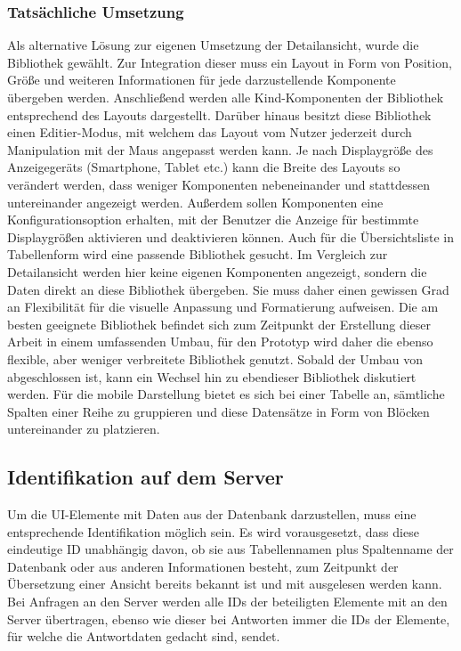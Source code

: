 \subsubsection{Tatsächliche Umsetzung}\label{subsec:layout}
Als alternative Lösung zur eigenen Umsetzung der Detailansicht, wurde die Bibliothek  gewählt. Zur Integration dieser muss ein Layout in Form von Position, Größe und weiteren Informationen für jede darzustellende Komponente übergeben werden. Anschließend werden alle Kind-Komponenten der Bibliothek entsprechend des Layouts dargestellt. Darüber hinaus besitzt diese Bibliothek einen Editier-Modus, mit welchem das Layout vom Nutzer jederzeit durch Manipulation mit der Maus angepasst werden kann. Je nach Displaygröße des Anzeigegeräts (Smartphone, Tablet etc.) kann die Breite des Layouts so verändert werden, dass weniger Komponenten nebeneinander und stattdessen untereinander angezeigt werden. Außerdem sollen Komponenten eine Konfigurationsoption erhalten, mit der Benutzer die Anzeige für bestimmte Displaygrößen aktivieren und deaktivieren können.
Auch für die Übersichtsliste in Tabellenform wird eine passende Bibliothek gesucht. Im Vergleich zur Detailansicht werden hier keine eigenen Komponenten angezeigt, sondern die Daten direkt an diese Bibliothek übergeben. Sie muss daher einen gewissen Grad an Flexibilität für die visuelle Anpassung und Formatierung aufweisen. Die am besten geeignete Bibliothek  befindet sich zum Zeitpunkt der Erstellung dieser Arbeit in einem umfassenden Umbau, für den Prototyp wird daher die ebenso flexible, aber weniger verbreitete Bibliothek  genutzt. Sobald der Umbau von  abgeschlossen ist, kann ein Wechsel hin zu ebendieser Bibliothek diskutiert werden. Für die mobile Darstellung bietet es sich bei einer Tabelle an, sämtliche Spalten einer Reihe zu gruppieren und diese Datensätze in Form von Blöcken untereinander zu platzieren.

\subsection{Identifikation auf dem Server}
Um die UI-Elemente mit Daten aus der Datenbank darzustellen, muss eine entsprechende Identifikation möglich sein. Es wird vorausgesetzt, dass diese eindeutige ID unabhängig davon, ob sie aus Tabellennamen plus Spaltenname der Datenbank oder aus anderen Informationen besteht, zum Zeitpunkt der Übersetzung einer Ansicht bereits bekannt ist und mit ausgelesen werden kann. Bei Anfragen an den Server werden alle IDs der beteiligten Elemente mit an den Server übertragen, ebenso wie dieser bei Antworten immer die IDs der Elemente, für welche die Antwortdaten gedacht sind, sendet.

